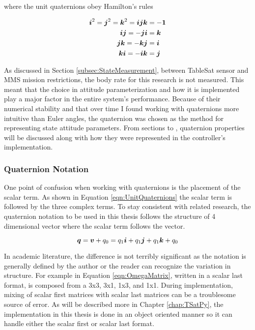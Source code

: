 where the unit quaternions obey Hamilton's rules \cite{wolfram_quaternion}

\begin{subequations}
  \begin{align}
    \boldsymbol{i}^2 = \boldsymbol{j}^2 = \boldsymbol{k}^2 = \boldsymbol{ijk} & = - \boldsymbol{1} \\
    \boldsymbol{i}\boldsymbol{j} = -\boldsymbol{j}\boldsymbol{i} &= \boldsymbol{k} \\
    \boldsymbol{j}\boldsymbol{k} = -\boldsymbol{k}\boldsymbol{j} &= \boldsymbol{i} \\
    \boldsymbol{k}\boldsymbol{i} = -\boldsymbol{i}\boldsymbol{k} &= \boldsymbol{j}
  \end{align}
  \label{eqn:HamiltonRules}
\end{subequations}

As discussed in Section \ref{subsec:StateMeasurement}, between TableSat sensor and MMS mission restrictions, the body rate for this research is not measured.  This meant that the choice in attitude parameterization and how it is implemented play a major factor in the entire system's performance.  Because of their numerical stability and that over time I found working with quaternions more intuitive than Euler angles, the quaternion was chosen as the method for representing state attitude parameters.  From sections  to , quaternion properties will be discussed along with how they were represented in the controller's implementation.

\subsubsection{Quaternion Notation}
\label{subsubsec:QuaternionNotation}

One point of confusion when working with quaternions is the placement of the scalar term.  As shown in Equation \ref{eqn:UnitQuaternions} the scalar term is followed by the three complex terms.  To stay consistent with related research, the quaternion notation to be used in this thesis follows the structure of 4 dimensional vector where the scalar term follows the vector.

\begin{equation}
  \boldsymbol{q} = \boldsymbol{v} + q_0 = q_1 \boldsymbol{i} + q_1 \boldsymbol{j} + q_1 \boldsymbol{k} + q_0
\end{equation}

In academic literature, the difference is not terribly significant as the notation is generally defined by the author or the reader can recognize the variation in structure.  For example in Equation \ref{eqn:OmegaMatrix}, written in a scalar last format, is composed from a 3x3, 3x1, 1x3, and 1x1.  During implementation, mixing of scalar first matrices with scalar last matrices can be a troublesome source of error.  As will be described more in Chapter \ref{chap:TSatPy}, the implementation in this thesis is done in an object oriented manner so it can handle either the scalar first or scalar last format.

